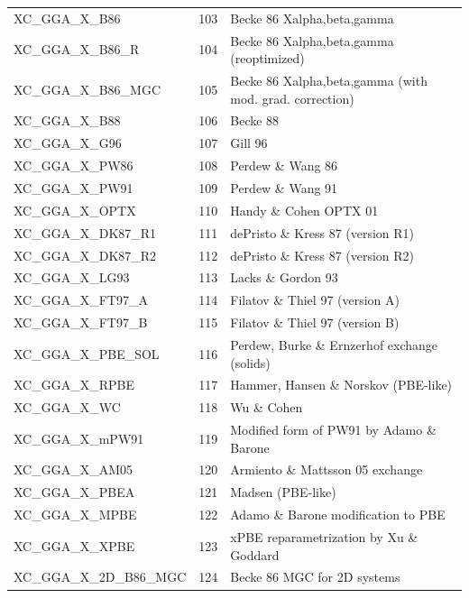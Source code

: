 \documentclass[a4paper,11pt]{report}
\begin{document}
\begin{longtable}{lrl}
   XC\_GGA\_X\_B86            & 103  &  Becke 86 Xalpha,beta,gamma                      \\
   XC\_GGA\_X\_B86\_R         & 104  &  Becke 86 Xalpha,beta,gamma (reoptimized)        \\
   XC\_GGA\_X\_B86\_MGC       & 105  &  Becke 86 Xalpha,beta,gamma (with mod. grad. correction) \\
   XC\_GGA\_X\_B88            & 106  &  Becke 88 \\
   XC\_GGA\_X\_G96            & 107  &  Gill 96                                        \\
   XC\_GGA\_X\_PW86           & 108  &  Perdew \& Wang 86 \\
   XC\_GGA\_X\_PW91           & 109  &  Perdew \& Wang 91 \\
   XC\_GGA\_X\_OPTX           & 110  &  Handy \& Cohen OPTX 01                          \\
   XC\_GGA\_X\_DK87\_R1       & 111  &  dePristo \& Kress 87 (version R1)               \\
   XC\_GGA\_X\_DK87\_R2       & 112  &  dePristo \& Kress 87 (version R2)               \\
   XC\_GGA\_X\_LG93           & 113  &  Lacks \& Gordon 93 \\
   XC\_GGA\_X\_FT97\_A        & 114  &  Filatov \& Thiel 97 (version A) \\
   XC\_GGA\_X\_FT97\_B        & 115  &  Filatov \& Thiel 97 (version B) \\
   XC\_GGA\_X\_PBE\_SOL       & 116  &  Perdew, Burke \& Ernzerhof exchange (solids)    \\
   XC\_GGA\_X\_RPBE           & 117  &  Hammer, Hansen \& Norskov (PBE-like) \\
   XC\_GGA\_X\_WC             & 118  &  Wu \& Cohen \\
   XC\_GGA\_X\_mPW91          & 119  &  Modified form of PW91 by Adamo \& Barone \\
   XC\_GGA\_X\_AM05           & 120  &  Armiento \& Mattsson 05 exchange                \\
   XC\_GGA\_X\_PBEA           & 121  &  Madsen (PBE-like) \\
   XC\_GGA\_X\_MPBE           & 122  &  Adamo \& Barone modification to PBE             \\
   XC\_GGA\_X\_XPBE           & 123  &  xPBE reparametrization by Xu \& Goddard         \\
   XC\_GGA\_X\_2D\_B86\_MGC   & 124  &  Becke 86 MGC for 2D systems \\

\end{longtable}
\end{document}
